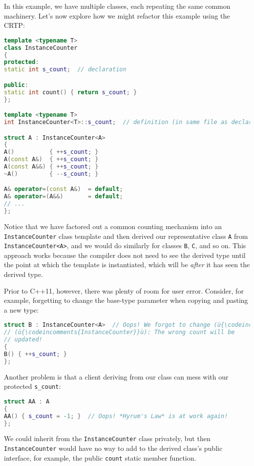 \noindent In this example, we have multiple classes, each repeating the same
common machinery. Let's now explore how we might refactor this example
using the CRTP:

\begin{lstlisting}[language=C++]
template <typename T>
class InstanceCounter
{
protected:
static int s_count;  // declaration

public:
static int count() { return s_count; }
};

template <typename T>
int InstanceCounter<T>::s_count;  // definition (in same file as declaration)

struct A : InstanceCounter<A>
{
A()          { ++s_count; }
A(const A&)  { ++s_count; }
A(const A&&) { ++s_count; }
~A()         { --s_count; }

A& operator=(const A&)  = default;
A& operator=(A&&)       = default;
// ...
};
\end{lstlisting}

\noindent Notice that we have factored out a common counting mechanism into an
\texttt{InstanceCounter} class template and then derived our
representative class \texttt{A} from \texttt{InstanceCounter<A>}, and we
would do similarly for classes \texttt{B}, \texttt{C}, and so on. This
approach works because the compiler does not need to see the derived
type until the point at which the template is instantiated, which will
be \emph{after} it has seen the derived type.

Prior to C++11, however, there was plenty of room for user error.
Consider, for example, forgetting to change the base-type parameter when
copying and pasting a new type:

\begin{lstlisting}[language=C++]
struct B : InstanceCounter<A>  // Oops! We forgot to change (ù{\codeincomments{A}}ù) to (ù{\codeincomments{B}}ù) in
// (ù{\codeincomments{InstanceCounter}}ù): The wrong count will be
// updated!
{
B() { ++s_count; }
};
\end{lstlisting}

\noindent Another problem is that a client deriving from our class can mess with
our protected \texttt{s\_count}:

\begin{lstlisting}[language=C++]
struct AA : A
{
AA() { s_count = -1; }  // Oops! *Hyrum's Law* is at work again!
};
\end{lstlisting}

\noindent We could inherit from the \texttt{InstanceCounter} class privately, but
then \texttt{InstanceCounter} would have no way to add to the derived
class's public interface, for example, the public \texttt{count} static
member function.

